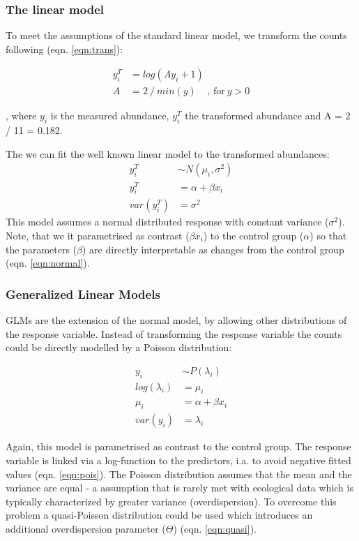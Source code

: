 \documentclass{scrartcl}
\begin{document}
\subsubsection{The linear model}
To meet the assumptions of the standard linear model, we transform the counts following \citet{van_den_brink_impact_2000} (eqn. \ref{eqn:trans}):

\begin{align}
  y^T_i & = log(Ay_i + 1) \label{eqn:trans} \\
  A & = 2~/~min(y)~~~~~\text{, for}~ y > 0 \nonumber
\end{align}

, where $y_i$ is the measured abundance, $y_i^T$ the transformed abundance and A = 2 / 11 = 0.182.

The we can fit the well known linear model to the transformed abundances:
\begin{align}
  y_i^T &\sim N(\mu_i, \sigma^2) \nonumber \\
  y_i^T &= \alpha + \beta x_i \label{eqn:normal} \\
  var(y_i^T) &= \sigma^2 \nonumber
\end{align}
This model assumes a normal distributed response with constant variance ($\sigma^2$).
Note, that we it parametrised as contrast ($\beta x_i$) to the control group ($\alpha$) so that the parameters ($\beta$) are directly interpretable as changes from the control group (eqn. \ref{eqn:normal}).


\subsubsection{Generalized Linear Models}
GLMs are the extension of the normal model, by allowing other distributions of the response variable.
Instead of transforming the response variable the counts could be directly modelled by a Poisson distribution:

\begin{align}
  y_i &\sim P(\lambda_i) \nonumber \\
  log(\lambda_i) &= \mu_i \label{eqn:pois} \\
  \mu_i &= \alpha + \beta x_i \nonumber \\
  var(y_i) &= \lambda_i \nonumber
\end{align}

Again, this model is parametrised as contrast to the control group. 
The response variable is linked via a log-function to the predictors, i.a. to avoid negative fitted values (eqn. \ref{eqn:pois}). 
The Poisson distribution assumes that the mean and the variance are equal - a assumption that is rarely met with ecological data which is typically characterized by greater variance (overdispersion).
To overcome this problem a quasi-Poisson distribution could be used which introduces an additional overdispersion parameter ($\Theta$) (eqn. \ref{eqn:quasi}).
\end{document}
